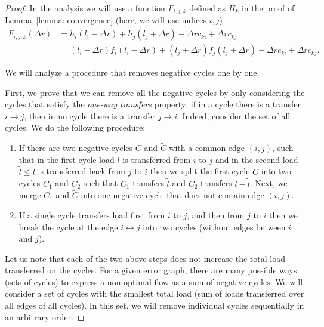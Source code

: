 \documentclass[11pt]{article}
\begin{document}
\begin{proof}
In the analysis we will use a function $F_{i, j, k}$ defined as $H_k$ in the proof of Lemma~\ref{lemma::convergence} (here, we will use indices $i,j$) 
\begin{align*}
F_{i, j, k}(\Delta r) &= h_{i}(l_i - \Delta r) + h_{j}(l_j + \Delta r) - \Delta r c_{ki} + \Delta r c_{kj} \\
                      &= (l_i - \Delta r)f_{i}(l_i - \Delta r) + (l_j + \Delta r)f_{j}(l_j + \Delta r) - \Delta r c_{ki} + \Delta r c_{kj} \text{.}
\end{align*}

We will analyze a procedure that removes negative cycles one by one. 

First, we prove that we can remove all the negative cycles by only considering the cycles that satisfy the \emph{one-way transfers} property: if in a cycle there is a transfer $i \to j$, then in no cycle there is a transfer $j \to i$.
Indeed, consider the set of all cycles. We do the following procedure:
\begin{enumerate}
\item If there are two negative cycles $C$ and $\tilde{C}$ with a common edge $(i, j)$, such that in the first cycle load $l$ is transferred from $i$ to $j$ and in the second load $\tilde{l} \leq l$ is
transferred back from $j$ to $i$ 
then we split the first cycle $C$ into two cycles $C_1$ and $C_2$ such that $C_1$ transfers $\tilde{l}$ and $C_2$ transfers $l - \tilde{l}$. Next, we merge $C_1$ and $\tilde{C}$ into one negative cycle that does not contain edge $(i, j)$. 
\item If a single cycle transfers load first from $i$ to $j$, and then from $j$ to $i$ then we break the cycle at the edge $i \leftrightarrow j$ into two cycles (without edges between $i$ and $j$).  \label{enum:cycle-break2}
\end{enumerate}
Let us note that each of the two above steps does not increase the total load transferred on the cycles.
For a given error graph, there are many possible ways (sets of cycles) to express a non-optimal flow as a sum of negative cycles. We will consider a set of cycles with the smallest total load (sum of loads transferred over all edges of all cycles).
In this set, we will remove individual cycles sequentially in an arbitrary order.


\end{proof}
\end{document}
